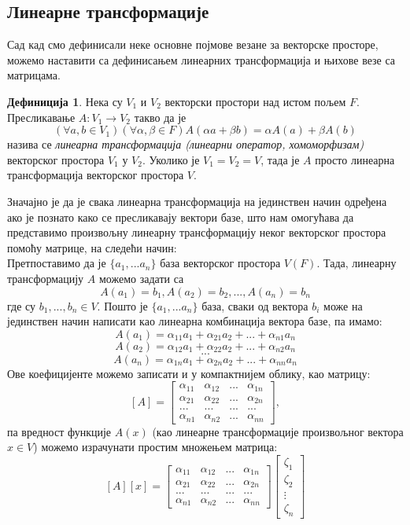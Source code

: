\documentclass{report}
\theoremstyle{plain}
\theoremstyle{definition}
\newtheorem{defn}{Дефиниција}
\begin{document}
\subsection{Линеарне трансформације}
Сад кад смо дефинисали неке основне појмове везане за векторске просторе, можемо наставити са дефинисањем линеарних трансформација и њихове везе са матрицама.
\begin{defn}
Нека су $V_1$ и $V_2$ векторски простори над истом пољем $F$. Пресликавање $A: V_1\to V_2$ такво да је
$$(\forall a, b\in V_1)(\forall \alpha, \beta \in F) A(\alpha a+ \beta b) = \alpha A(a) + \beta A(b)$$
назива се \emph{линеарна трансформација (линеарни оператор, хомоморфизам)} векторског простора $V_1$ у $V_2$. Уколико је $V_1 = V_2 = V$, тада је $A$ просто линеарна трансформација векторског простора $V$.
\end{defn}
Значајно је да је свака линеарна трансформација на јединствен начин одређена ако је познато како се пресликавају вектори базе, што нам омогућава да представимо произвољну линеарну трансформацију неког векторског простора помоћу матрице, на следећи начин:\\
Претпоставимо да је $\{a_1, ...a_n\}$ база векторског простора $V(F)$. Тада, линеарну трансформацију $A$ можемо задати са
$$A(a_1) = b_1, A(a_2) = b_2, ..., A(a_n) = b_n$$
где су $b_1, ..., b_n\in V$. Пошто је $\{a_1, ...a_n\}$ база, сваки од вектора $b_i$ може на јединствен начин написати као линеарна комбинација вектора базе, па имамо:
$$A(a_1) = \alpha_{11}a_1 + \alpha_{21}a_2 + ... + \alpha_{n1}a_n$$
$$A(a_2) = \alpha_{12}a_1 + \alpha_{22}a_2 + ... + \alpha_{n2}a_n$$
$$...$$
$$A(a_n) = \alpha_{1n}a_1 + \alpha_{2n}a_2 + ... + \alpha_{nn}a_n$$
Ове коефицијенте можемо записати и у компактнијем облику, као матрицу:
$$[A] = \begin{bmatrix}
    \alpha_{11} & \alpha_{12} & ... & \alpha_{1n} \\
    \alpha_{21} & \alpha_{22} & ... & \alpha_{2n} \\
    ... & ... & ... & ... \\
    \alpha_{n1} & \alpha_{n2} & ... & \alpha_{nn}
  \end{bmatrix},$$
па вредност функције $A(x)$ (као линеарне трансформације произвољног вектора $x\in V$) можемо израчунати простим множењем матрица:
$$[A][x] = \begin{bmatrix}
            \alpha_{11} & \alpha_{12} & ... & \alpha_{1n} \\
            \alpha_{21} & \alpha_{22} & ... & \alpha_{2n} \\
            ... & ... & ... & ... \\
            \alpha_{n1} & \alpha_{n2} & ... & \alpha_{nn}
           \end{bmatrix}
           \begin{bmatrix}
           \zeta_1\\
           \zeta_2\\
           \vdots \\
           \zeta_n
           \end{bmatrix}
$$
\end{document}
